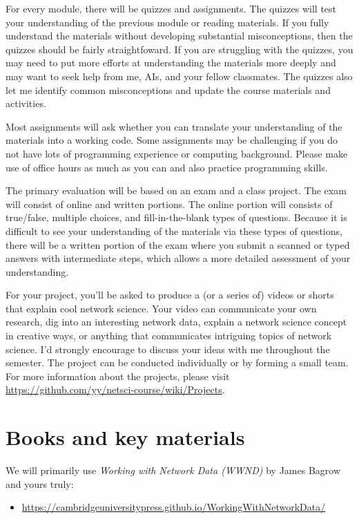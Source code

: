 \documentclass[11pt,article,oneside]{memoir} %
\begin{document}
For every module, there will be quizzes and assignments. The quizzes will test your understanding of the previous module or reading materials. If you fully understand the materials without developing substantial misconceptions, then the quizzes should be fairly straightfoward. If you are struggling with the quizzes, you may need to put more efforts at understanding the materials more deeply and may want to seek help from me, AIs, and your fellow classmates. The quizzes also let me identify common misconceptions and update the course materials and activities. 

Most assignments will ask whether you can translate your understanding of the materials into a working code. Some assignments may be challenging if you do not have lots of programming experience or computing background. Please make use of office hours as much as you can and also practice programming skills. 

The primary evaluation will be based on an exam and a class project.
The exam will consist of online and written portions. The online portion will consists of true/false, multiple choices, and fill-in-the-blank types of questions.  
Because it is difficult to see your understanding of the materials via these types of questions, there will be a written portion of the exam where you submit a scanned or typed answers with intermediate steps, which allows a more detailed assessment of your understanding.  

For your project, you'll be asked to produce a (or a series of) videos or shorts that explain cool network science. Your video can communicate your own research, dig into an interesting network data, explain a network science concept in creative ways, or anything that communicates intriguing topics of network science. I'd strongly encourage to discuss your ideas with me throughout the semester. 
The project can be conducted individually or by forming a small team.
For more information about the projects, please visit \url{https://github.com/yy/netsci-course/wiki/Projects}.

\section{Books and key materials} %

We will primarily use \emph{Working with Network Data (WWND)} by James Bagrow and yours truly:
\begin{itemize}\vspace{-10pt}
  \item \url{https://cambridgeuniversitypress.github.io/WorkingWithNetworkData/}
\end{itemize}
\end{document}
